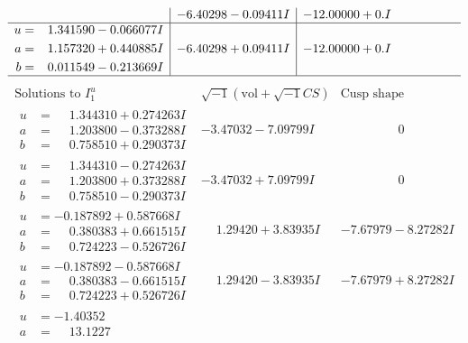 \documentclass[1p]{elsarticle_modified}
\theoremstyle{definition}
\newcommand{\I}{\sqrt{-1}}
\begin{document}
$$\begin{array}{c|c|c}
 & -6.40298 - 0.09411 I & -12.00000 + 0. I\phantom{ +0.000000I} \\ \hline\begin{aligned}
u &= \phantom{-}1.341590 - 0.066077 I \\
a &= \phantom{-}1.157320 + 0.440885 I \\
b &= \phantom{-}0.011549 - 0.213669 I\end{aligned}
 & -6.40298 + 0.09411 I & -12.00000 + 0. I\phantom{ +0.000000I}\\
 \hline 
 \end{array}$$\newpage$$\begin{array}{c|c|c}  
\text{Solutions to }I^u_{1}& \I (\text{vol} + \sqrt{-1}CS) & \text{Cusp shape}\\
 \hline 
\begin{aligned}
u &= \phantom{-}1.344310 + 0.274263 I \\
a &= \phantom{-}1.203800 - 0.373288 I \\
b &= \phantom{-}0.758510 + 0.290373 I\end{aligned}
 & -3.47032 - 7.09799 I & \phantom{-0.000000 } 0 \\ \hline\begin{aligned}
u &= \phantom{-}1.344310 - 0.274263 I \\
a &= \phantom{-}1.203800 + 0.373288 I \\
b &= \phantom{-}0.758510 - 0.290373 I\end{aligned}
 & -3.47032 + 7.09799 I & \phantom{-0.000000 } 0 \\ \hline\begin{aligned}
u &= -0.187892 + 0.587668 I \\
a &= \phantom{-}0.380383 + 0.661515 I \\
b &= \phantom{-}0.724223 - 0.526726 I\end{aligned}
 & \phantom{-}1.29420 + 3.83935 I & -7.67979 - 8.27282 I \\ \hline\begin{aligned}
u &= -0.187892 - 0.587668 I \\
a &= \phantom{-}0.380383 - 0.661515 I \\
b &= \phantom{-}0.724223 + 0.526726 I\end{aligned}
 & \phantom{-}1.29420 - 3.83935 I & -7.67979 + 8.27282 I \\ \hline\begin{aligned}
u &= -1.40352\phantom{ +0.000000I} \\
a &= \phantom{-}13.1227\phantom{ +0.000000I} \\

\end{aligned}
\end{array}$$
\end{document}
